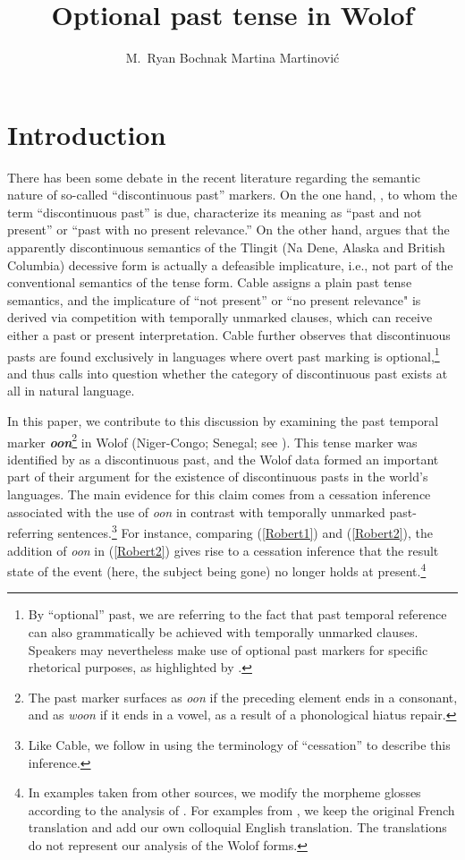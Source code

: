 \documentclass[output=paper
,modfonts
,nonflat]{langsci/langscibook}
\title{Optional past tense in Wolof}
\author{%
 M.~Ryan Bochnak\affiliation{University of Konstanz}\lastand%
 Martina Martinovi\'c\affiliation{University of Florida}
}
\begin{document}
\maketitle

\section{Introduction} 

There has been some debate in the recent literature regarding the semantic nature of so-called ``discontinuous past'' markers. On the one hand, \citet{plungian06towards}, to whom the term ``discontinuous past'' is due, characterize its meaning as ``past and not present'' or ``past with no present relevance.'' On the other hand, \citet{cable16implicatures} 
argues that the apparently discontinuous semantics of the Tlingit (Na Dene, Alaska and British Columbia) decessive form \citep{leer91tlingit} is actually a defeasible implicature, i.e., not part of the conventional semantics of the tense form. Cable assigns a plain past tense semantics, and the implicature of ``not present'' or ``no present relevance" is derived via competition with temporally unmarked clauses, which can receive either a past or present interpretation. Cable further observes that discontinuous pasts are found exclusively in languages where overt past marking is optional,\footnote{By ``optional'' past, we are referring to the fact that past temporal reference can also grammatically be achieved with temporally unmarked clauses. Speakers may nevertheless make use of optional past markers for specific rhetorical purposes, as highlighted by \citet{plungian06towards}.} and thus calls into question whether the category of discontinuous past exists at all in natural language.

In this paper, we contribute to this discussion by examining the past temporal marker
\textit{\textbf{oon}}\footnote{The past marker surfaces as
  \textit{oon} if the preceding element ends in a consonant, and as
  \textit{woon} if it ends in a vowel, as a result of a phonological hiatus repair.} in Wolof (Niger-Congo; Senegal; see \citealt{church81systeme, robert91approche}). This tense marker was identified by \citet{plungian06towards} as a discontinuous past, and the Wolof data formed an important part of their argument for the existence of discontinuous pasts in the world's languages. The main evidence for this claim comes from a cessation inference associated with the use of \textit{oon} in contrast with temporally unmarked past-referring sentences.\footnote{Like Cable, we follow \citet{altshuler12moment} in using the terminology of ``cessation'' to describe this inference.} For instance, comparing (\ref{Robert1}) and (\ref{Robert2}), the addition of \textit{oon} in (\ref{Robert2}) gives rise to a cessation inference that the result state of the event (here, the subject being gone) no longer holds at present.\footnote{In examples taken from other sources, we modify the morpheme glosses according to the analysis of \citet{Martinovic2015b}. For examples from \citealt{robert91approche}, we keep the original French translation and add our own colloquial English translation. The translations do not represent our analysis of the Wolof forms.}
\end{document}
